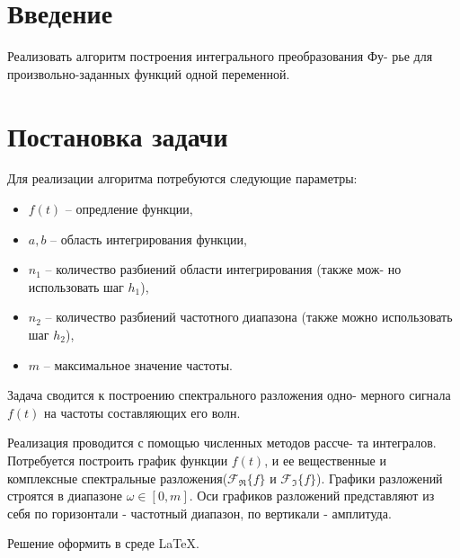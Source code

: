 \documentclass[14pt, titlepage,fleqn]{extarticle}
\begin{document}


\newpage

\tableofcontents
\clearpage
\section*{Введение}
Реализовать алгоритм построения интегрального преобразования Фу-
рье для произвольно-заданных функций одной переменной. 
\newpage









\section*{Постановка задачи}
Для реализации алгоритма потребуются следующие параметры:

\begin{itemize}
	\item $f(t)$ -- опредление функции,
	
	\item $a, b$ -- область интегрирования функции,
 
	\item $n_1$ -- количество разбиений области интегрирования (также мож-
	но использовать шаг $h_1$),	

	\item $n_2$ -- количество разбиений частотного диапазона (также можно
	использовать шаг $h_2$),

	\item $m$ -- максимальное значение частоты.
\end{itemize}

Задача сводится к построению спектрального разложения одно-
мерного сигнала $f(t)$ на частоты составляющих его волн.

Реализация проводится с помощью численных методов рассче-
та интегралов. Потребуется построить график функции $f(t)$, и ее
вещественные и комплексные спектральные разложения($\mathscr{F}_\Re\{f\}$ и $\mathscr{F}_\Im\{f\}$). Графики разложений строятся в диапазоне $\omega \in [0, m]$. Оси
графиков разложений представляют из себя по горизонтали - частотный диапазон, по вертикали - амплитуда.

Решение оформить в среде \LaTeX.
\newpage
\end{document}
